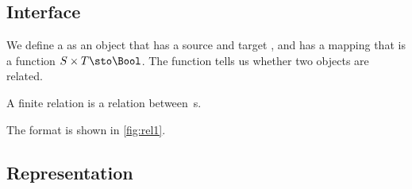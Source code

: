 
\subsection*{Interface}

We define a \Relation as an object that has a source and target \Setoid, and has a mapping that is a function $S \times T \sto \Bool$.
The function tells us whether two objects are related.


A finite relation  is a relation between \FiniteSet\,s.


The format is shown in \cref{fig:rel1}.

\subsection*{Representation}{}

\begin{marginfigure}
	\caption{}
	\label{fig:rel1}
\end{marginfigure}


